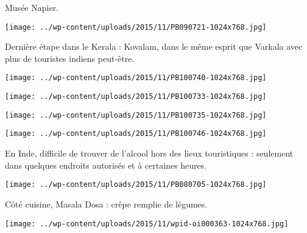  Musée Napier. 
\begin{center} \texttt{[image: ../wp-content/uploads/2015/11/PB090721-1024x768.jpg]} \end{center}

\pagebreak
 Dernière étape dans le Kerala : Kovalam, dans le même esprit que Varkala avec plus de touristes indiens peut-être. 
\begin{center} \texttt{[image: ../wp-content/uploads/2015/11/PB100740-1024x768.jpg]} \end{center}
\begin{center} \texttt{[image: ../wp-content/uploads/2015/11/PB100733-1024x768.jpg]} \end{center}
\begin{center} \texttt{[image: ../wp-content/uploads/2015/11/PB100735-1024x768.jpg]} \end{center}
\begin{center} \texttt{[image: ../wp-content/uploads/2015/11/PB100746-1024x768.jpg]} \end{center}

\pagebreak
 En Inde, difficile de trouver de l'alcool hors des lieux touristiques : seulement dans quelques endroits autorisés et à certaines heures. 
\begin{center} \texttt{[image: ../wp-content/uploads/2015/11/PB080705-1024x768.jpg]} \end{center}

  Côté cuisine, Masala Dosa : crêpe remplie de légumes.
\begin{center} \texttt{[image: ../wp-content/uploads/2015/11/wpid-oi000363-1024x768.jpg]} \end{center}
